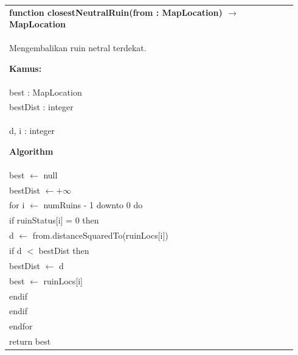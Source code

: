 \documentclass{article}
\newenvironment{pseudobox}
{
\centering
\begin{longtable}{|p{0.94\linewidth}|}
\hline
}
{
\\ \hline
\end{longtable}
\vspace{0.05cm}
}
\begin{document}
\begin{pseudobox}
\textbf{function closestNeutralRuin(from : MapLocation) $\rightarrow$ MapLocation} \\
{ Mengembalikan ruin netral terdekat. }

\textbf{Kamus:} \\
\hspace*{1em} best : MapLocation \\
\hspace*{1em} bestDist : integer \\
\hspace*{1em} d, i : integer

\textbf{Algorithm} \\
\hspace*{1em} best $\leftarrow$ null \\
\hspace*{1em} bestDist $\leftarrow +\infty$ \\

\hspace*{1em} for i $\leftarrow$ numRuins - 1 downto 0 do \\
\hspace*{2em} if ruinStatus[i] = 0 then \\
\hspace*{3em} d $\leftarrow$ from.distanceSquaredTo(ruinLocs[i]) \\
\hspace*{3em} if d $<$ bestDist then \\
\hspace*{4em} bestDist $\leftarrow$ d \\
\hspace*{4em} best $\leftarrow$ ruinLocs[i] \\
\hspace*{3em} endif \\
\hspace*{2em} endif \\
\hspace*{1em} endfor \\

\hspace*{1em} return best
\end{pseudobox}
\end{document}
